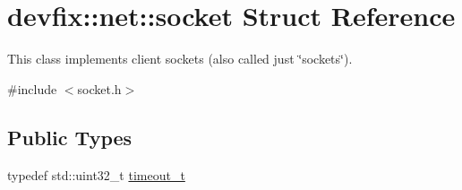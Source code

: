 \hypertarget{structdevfix_1_1net_1_1socket}{}\section{devfix\+:\+:net\+:\+:socket Struct Reference}
\label{structdevfix_1_1net_1_1socket}


This class implements client sockets (also called just \char`\"{}sockets\char`\"{}).  




{\ttfamily \#include $<$socket.\+h$>$}

\subsection*{Public Types}
\begin{DoxyCompactItemize}
\item 
typedef std\+::uint32\+\_\+t \hyperlink{structdevfix_1_1net_1_1socket_a80a3bf4cb7292bae31ea9c6575539c68}{timeout\+\_\+t}
\end{DoxyCompactItemize}
